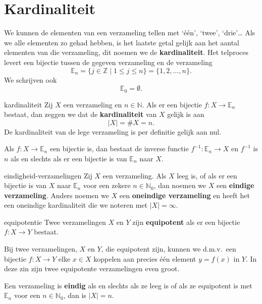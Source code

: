 \chapter{Kardinaliteit}
We kunnen de elementen van een verzameling tellen met `één', `twee', `drie'\ldots
Als we alle elementen zo gehad hebben, is het laatste getal gelijk aan het aantal elementen van die verzameling, dit noemen we de \textbf{kardinaliteit}.
Het telproces levert een bijectie tussen de gegeven verzameling en de verzameling
\marginpar{}
\[
    \mathbb{E}_n = \{j \in \mathbb{Z} \mid 1 \leq j \leq n\} = \{1,2, \ldots, n\}.
\]
We schrijven ook
\[
    \mathbb{E}_0 = \emptyset.
\]
\begin{definitie}{}{kardinaliteit}
    Zij $X$ een verzameling en $n \in \mathbb{N}$.
    Als er een bijectie $f: X \to \mathbb{E}_n$
    bestaat,
    dan zeggen we dat de \textbf{kardinaliteit} van $X$ gelijk is aan
    \[
        \lvert X\rvert = \# X = n.
    \]
    De kardinaliteit van de lege verzameling is per definitie gelijk aan nul.
\end{definitie}
Als $f: X \to \mathbb{E}_n$ een bijectie is, dan bestaat de inverse functie $f^{-1}: \mathbb{E}_n \to X$ en $f^{-1}$ is $n$ als en slechts als er een bijectie is van $\mathbb{E}_n$ naar $X$.

\begin{definitie}{}{eindigheid-verzamelingen}
    Zij $X$ een verzameling.
    Als $X$ leeg is, of als er een bijectie is van $X$ naar $\mathbb{E}_n$ voor een zekere $n \in \mathbb{N}_0$, dan noemen we $X$ een \textbf{eindige verzameling}.
    Anders noemen we $X$ een \textbf{oneindige verzameling} en heeft het een oneindige kardinaliteit die we noteren met $\lvert X\rvert = \infty$.
\end{definitie}

\begin{definitie}{}{equipotentie}
    Twee verzamelingen $X$ en $Y$ zijn \textbf{equipotent} als er een bijectie $f: X \to Y$ bestaat.
\end{definitie}

Bij twee verzamelingen, $X$ en $Y$, die equipotent zijn, kunnen we d.m.v.\ een bijectie $f: X \to Y$ elke $x \in X$ koppelen aan precies één element $y = f(x)$ in $Y$.
In deze zin zijn twee equipotente verzamelingen even groot.

Een verzameling is \textbf{eindig} als en slechts als ze leeg is of als ze equipotent is met $\mathbb{E}_n$ voor een $n \in \mathbb{N}_0$, dan is $\lvert X\rvert = n$.

